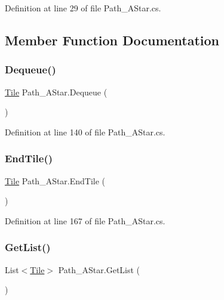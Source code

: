 Definition at line 29 of file Path\+\_\+\+A\+Star.\+cs.



\subsection{Member Function Documentation}
\mbox{\label{class_path___a_star_af284152da3bdc3e64635d132b0e73d38}} 
\subsubsection{\texorpdfstring{Dequeue()}{Dequeue()}}
{\footnotesize\ttfamily \hyperlink{class_tile}{Tile} Path\+\_\+\+A\+Star.\+Dequeue (\begin{DoxyParamCaption}{ }\end{DoxyParamCaption})}



Definition at line 140 of file Path\+\_\+\+A\+Star.\+cs.

\mbox{\label{class_path___a_star_a13629f55ecca04b9d4993356edb825e7}} 
\subsubsection{\texorpdfstring{End\+Tile()}{EndTile()}}
{\footnotesize\ttfamily \hyperlink{class_tile}{Tile} Path\+\_\+\+A\+Star.\+End\+Tile (\begin{DoxyParamCaption}{ }\end{DoxyParamCaption})}



Definition at line 167 of file Path\+\_\+\+A\+Star.\+cs.

\mbox{\label{class_path___a_star_a81fcf519a90b93c62276b80ccad130e5}} 
\subsubsection{\texorpdfstring{Get\+List()}{GetList()}}
{\footnotesize\ttfamily List$<$\hyperlink{class_tile}{Tile}$>$ Path\+\_\+\+A\+Star.\+Get\+List (\begin{DoxyParamCaption}{ }\end{DoxyParamCaption})}



